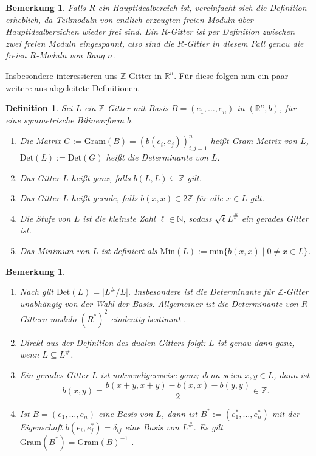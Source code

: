 \documentclass[12pt,a4paper,halfparskip,headsepline,bibtotocnumbered]{scrreprt}
\theoremstyle{nummermitklammern}
\newtheorem{definition}[defsatzusw]{Definition}
\newtheorem{bemerkung}[defsatzusw]{Bemerkung}
\theoremstyle{nonumberbreak}
\newcommand{\N}{\mathbb{N}}
\newcommand{\Z}{\mathbb{Z}}
\newcommand{\R}{\mathbb{R}}
\newcommand{\Det}{\text{Det}}
\newcommand{\Min}{\text{Min}}
\begin{document}
\begin{bemerkung}
	Falls $R$ ein Hauptidealbereich ist, vereinfacht sich die Definition erheblich, da Teilmoduln von endlich erzeugten freien Moduln über Hauptidealbereichen wieder frei sind. Ein $R$-Gitter ist per Definition zwischen zwei freien Moduln eingespannt, also sind die $R$-Gitter in diesem Fall genau die freien $R$-Moduln von Rang $n$.
\end{bemerkung}

Insbesondere interessieren uns $\Z$-Gitter in $\R^n$. Für diese folgen nun ein paar weitere aus \cite[Def. (1.7), (1.13), (14.7), (26.1)]{kneser} abgeleitete Definitionen.

\begin{framed}
	\begin{definition}
		Sei $L$ ein $\Z$-Gitter mit Basis $B = (e_1, \dots, e_n)$ in $(\R^n, b)$, für eine symmetrische Bilinearform $b$.
		\begin{enumerate}[label=(\roman*)]
			\item Die Matrix $G := \text{Gram}(B) = \left(b(e_i, e_j)\right)_{i,j=1}^n$ heißt \textit{Gram-Matrix} von $L$, $\Det(L) := \Det(G)$ heißt die \textit{Determinante} von $L$.
			\item Das Gitter $L$ heißt \textit{ganz}, falls $b(L,L) \subseteq \Z$ gilt.
			\item Das Gitter $L$ heißt \textit{gerade}, falls $b(x,x) \in 2\Z$ für alle $x \in L$ gilt.
			\item Die \textit{Stufe} von $L$ ist die kleinste Zahl $\ell \in \N$, sodass $\sqrt{\ell} L^\#$ ein gerades Gitter ist.
			\item Das \textit{Minimum} von $L$ ist definiert als $\Min(L) := \text{min} \lbrace b(x,x) \mid 0 \neq x \in L \rbrace$.
		\end{enumerate}
	\end{definition}
\end{framed}

\begin{bemerkung}\label{bem:dual}
	\begin{enumerate}[label=(\roman*)]
	\item Nach \cite[Satz (14.7)]{kneser} gilt $\Det(L) = \vert L^\# / L \vert$. 
		Insbesondere ist die Determinante für $\Z$-Gitter unabhängig von der Wahl der Basis. Allgemeiner ist die Determinante von $R$-Gittern modulo $\left( R^\ast \right) ^2$ eindeutig bestimmt \cite[(1.13)]{kneser}.
	\item Direkt aus der Definition des dualen Gitters folgt: $L$ ist genau dann ganz, wenn $L \subseteq L^\#$.
	\item Ein gerades Gitter $L$ ist notwendigerweise ganz; denn seien $x,y \in L$, dann ist
		\begin{equation*}
			b(x,y) = \frac{b(x+y,x+y) - b(x,x) - b(y,y)}{2} \in \Z.
		\end{equation*}
	\item Ist $B = (e_1,\dots,e_n)$ eine Basis von $L$, dann ist $B^\ast := (e_1^\ast, \dots, e_n^\ast)$ mit der Eigenschaft $b(e_i, e_j^\ast) = \delta_{ij}$ eine Basis von $L^\#$. Es gilt $\text{Gram}(B^\ast) = \text{Gram}(B)^{-1}$ \cite[(1.14)]{kneser}.
	\end{enumerate}
\end{bemerkung}
\end{document}
